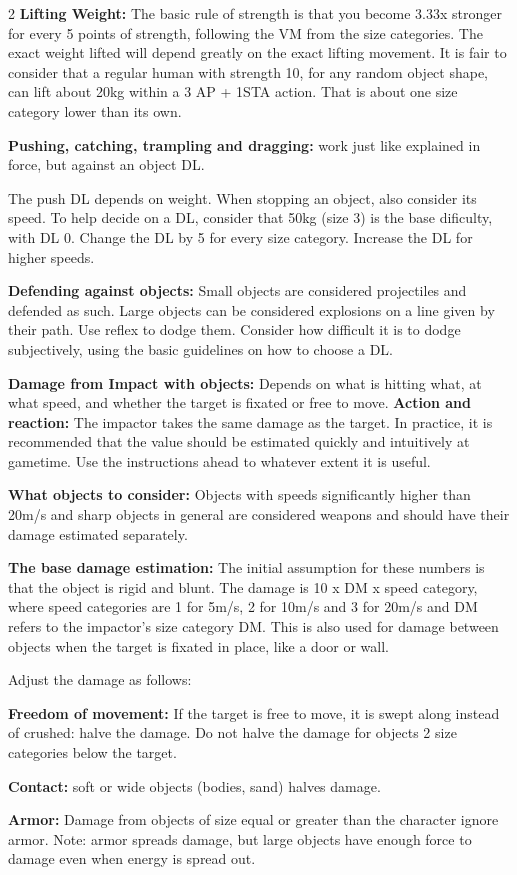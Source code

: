 \begin{multicols}{2}
\textbf{Lifting Weight:} The basic rule of strength is that you become 3.33x stronger for every 5 points of strength, following the VM from the size categories. The exact weight lifted will depend greatly on the exact lifting movement. It is fair to consider that a regular human with strength 10, for any random object shape, can lift about 20kg within a 3 AP + 1STA action. That is about one size category lower than its own.

\textbf{Pushing, catching, trampling and dragging:} work just like explained in force, but against an object DL.

The push DL depends on weight. When stopping an object, also consider its speed. To help decide on a DL, consider that 50kg (size 3) is the base dificulty, with DL 0. Change the DL by 5 for every size category. Increase the DL for higher speeds. 

\textbf{Defending against objects:} Small objects are considered projectiles and defended as such. Large objects can be considered explosions on a line given by their path. Use reflex to dodge them. Consider how difficult it is to dodge subjectively, using the basic guidelines on how to choose a DL.

\textbf{Damage from Impact with objects:} Depends on what is hitting what, at what speed, and whether the target is fixated or free to move. \textbf{Action and reaction:} The impactor takes the same damage as the target. In practice, it is recommended that the value should be estimated quickly and intuitively at gametime. Use the instructions ahead to whatever extent it is useful.

\textbf{What objects to consider:} Objects with speeds significantly higher than 20m/s and sharp objects in general are considered weapons and should have their damage estimated separately.

\textbf{The base damage estimation:} The initial assumption for these numbers is that the object is rigid and blunt. The damage is 10 x DM x speed category, where speed categories are 1 for 5m/s, 2 for 10m/s and 3 for 20m/s and DM refers to the impactor's size category DM. This is also used for damage between objects when the target is fixated in place, like a door or wall.

Adjust the damage as follows:

\begin{proplist}
    \item \textbf{Freedom of movement:} If the target is free to move, it is swept along instead of crushed: halve the damage. Do not halve the damage for objects 2 size categories below the target.
    \item \textbf{Contact:} soft or wide objects (bodies, sand) halves damage.
    \item \textbf{Armor:} Damage from objects of size equal or greater than the character ignore armor. Note: armor spreads damage, but large objects have enough force to damage even when energy is spread out.
\end{proplist}


\end{multicols}
